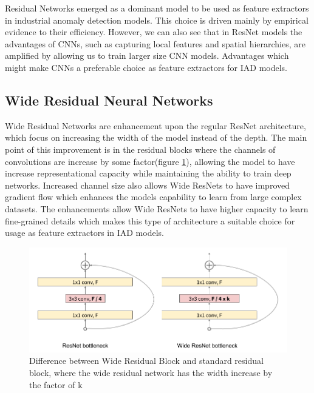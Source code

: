 Residual Networks emerged as a dominant model to be used as feature extractors in industrial anomaly detection models. This choice is driven mainly by empirical evidence to their efficiency. However, we can also see that in ResNet models the advantages of CNNs, such as capturing local features and spatial hierarchies, are amplified by allowing us to train larger size CNN models. Advantages which might make CNNs a preferable choice as feature extractors for IAD models.

\subsection{Wide Residual Neural Networks}
\label{wideresnet}
Wide Residual Networks are enhancement upon the regular ResNet architecture, which focus on increasing the width of the model instead of the depth. The main point of this improvement is in the residual blocks where the channels of convolutions are increase by some factor(figure \ref{fig:wide_resnet}), allowing the model to have increase representational capacity while maintaining the ability to train deep networks. Increased channel size also allows Wide ResNets to have improved gradient flow which enhances the models capability to learn from large complex datasets. The enhancements allow Wide ResNets to have higher capacity to learn fine-grained details which makes this type of architecture a suitable choice for usage as feature extractors in IAD models.

\begin{figure}[h]
	\begin{center}
		\includegraphics[width=1.0\linewidth]{Chapter_2/wide_resnet.png}
	\end{center}
	\caption{Difference between Wide Residual Block and standard residual block, where the wide residual network has the width increase by the factor of k}
	\label{fig:wide_resnet}
\end{figure}

